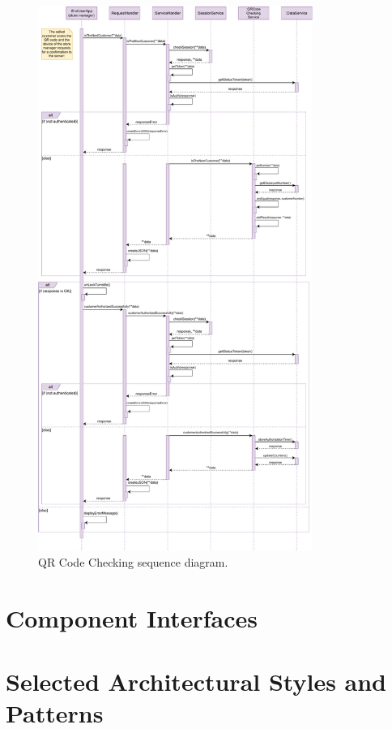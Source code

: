 \begin{figure}[H]
	\centering
	\includegraphics[width=0.8\textwidth]{images/qrCodeChecking_sequence_diagram.pdf}
	\caption{QR Code Checking sequence diagram.}
\end{figure}

\section{Component Interfaces}

\section{Selected Architectural Styles and Patterns}

